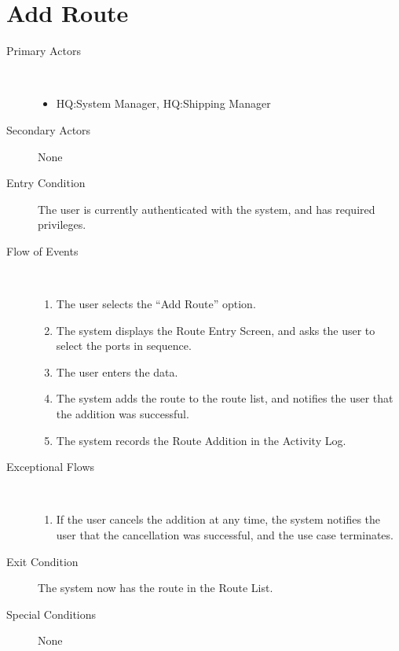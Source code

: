 \documentclass[a4paper,10pt]{report}
\begin{document}
\section{Add Route}
\begin{description}
\item[Primary Actors] \
  \begin{itemize}
  \item HQ:System Manager, HQ:Shipping Manager
  \end{itemize}
\item[Secondary Actors] None
\item[Entry Condition]
  The user is currently authenticated with the system, and has required privileges.
\item[Flow of Events] \
  \begin{enumerate}
  \item The user selects the ``Add Route'' option.
  \item The system displays the Route Entry Screen, and asks the user to select the ports in sequence.
  \item The user enters the data.
  \item The system adds the route to the route list, and notifies the user that the addition was successful.
    \item The system records the Route Addition in the Activity Log.
  \end{enumerate}
\item[Exceptional Flows] \
  \begin{enumerate}
  \item If the user cancels the addition at any time, the system notifies the user that the cancellation was successful, and the use case terminates.
  \end{enumerate}
\item[Exit Condition]
  The system now has the route in the Route List.
\item[Special Conditions] None
\end{description}
\end{document}
